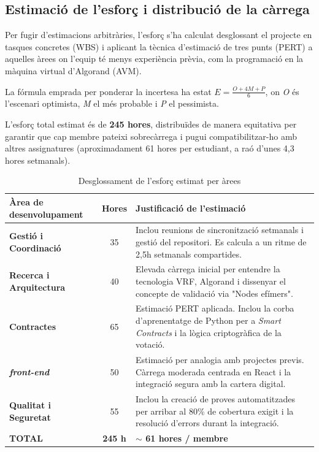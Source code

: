 \subsection{Estimació de l'esforç i distribució de la càrrega}

Per fugir d'estimacions arbitràries, l'esforç s'ha calculat desglossant el projecte en tasques concretes (WBS) i aplicant la tècnica d'estimació de tres punts (PERT) a aquelles àrees on l'equip té menys experiència prèvia, com la programació en la màquina virtual d'Algorand (AVM).

La fórmula emprada per ponderar la incertesa ha estat \( E = \frac{O + 4M + P}{6} \), on \textit{O} és l'escenari optimista, \textit{M} el més probable i \textit{P} el pessimista.

L'esforç total estimat és de \textbf{245 hores}, distribuïdes de manera equitativa per garantir que cap membre pateixi sobrecàrrega i pugui compatibilitzar-ho amb altres assignatures (aproximadament 61 hores per estudiant, a raó d'unes 4,3 hores setmanals).

\begin{table}[H]
\centering
\renewcommand{\arraystretch}{1.3}
\begin{tabularx}{\textwidth}{|l|c|X|}
\hline
\textbf{Àrea de desenvolupament} & \textbf{Hores} & \textbf{Justificació de l'estimació} \\ \hline
\textbf{Gestió i Coordinació} & 35 & Inclou reunions de sincronització setmanals i gestió del repositori. Es calcula a un ritme de 2,5h setmanals compartides. \\ \hline
\textbf{Recerca i Arquitectura} & 40 & Elevada càrrega inicial per entendre la tecnologia VRF, Algorand i dissenyar el concepte de validació via "Nodes efímers". \\ \hline
\textbf{Contractes} & 65 & Estimació PERT aplicada. Inclou la corba d'aprenentatge de Python per a \textit{Smart Contracts} i la lògica criptogràfica de la votació. \\ \hline
\textbf{\textit{front-end}} & 50 & Estimació per analogia amb projectes previs. Càrrega moderada centrada en React i la integració segura amb la cartera digital. \\ \hline
\textbf{Qualitat i Seguretat} & 55 & Inclou la creació de proves automatitzades per arribar al 80\% de cobertura exigit i la resolució d'errors durant la integració. \\ \hline
\textbf{TOTAL} & \textbf{245 h} & \textbf{\(\sim \) 61 hores / membre} \\ \hline
\end{tabularx}
\caption{Desglossament de l'esforç estimat per àrees}
\end{table}

